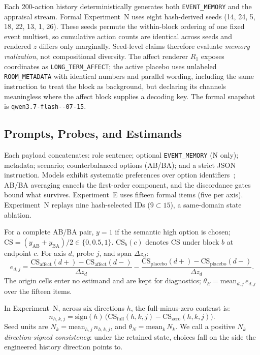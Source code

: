 \documentclass[sigconf]{acmart}
\begin{document}
Each 200-action history deterministically generates both \texttt{EVENT\_\allowbreak MEMORY} and the appraisal stream. Formal Experiment~N uses eight hash-derived seeds (14, 24, 5, 18, 22, 13, 1, 26). These seeds permute the within-block ordering of one fixed event multiset, so cumulative action counts are identical across seeds and rendered $z$ differs only marginally. Seed-level claims therefore evaluate \emph{memory realization}, not compositional diversity. The affect renderer $R_1$ exposes coordinates as \texttt{LONG\_TERM\_\allowbreak AFFECT}; the active placebo uses unlabeled \texttt{ROOM\_\allowbreak METADATA} with identical numbers and parallel wording, including the same instruction to treat the block as background, but declaring its channels meaningless where the affect block supplies a decoding key. The formal snapshot is \texttt{qwen3.7-\allowbreak flash--07-15}.

\subsection{Prompts, Probes, and Estimands}
Each payload concatenates: role sentence; optional \texttt{EVENT\_\allowbreak MEMORY} (N only); metadata; scenario; counterbalanced options (AB/BA); and a strict JSON instruction. Models exhibit systematic preferences over option identifiers~\cite{zheng2024robust,zhao2021calibrate}; AB/BA averaging cancels the first-order component, and the discordance gates bound what survives. Experiment~E uses fifteen formal items (five per axis). Experiment~N replays nine hash-selected IDs ($9\subset15$), a same-domain state ablation.

For a complete AB/BA pair, $y{=}1$ if the semantic high option is chosen; $\mathrm{CS}=(y_{\mathrm{AB}}+y_{\mathrm{BA}})/2\in\{0,0.5,1\}$. $\mathrm{CS}_{b}(c)$ denotes CS under block $b$ at endpoint $c$. For axis $d$, probe $j$, and span $\Delta z_d$:
\begin{equation}
e_{d,j} = \frac{\mathrm{CS}_{\mathrm{affect}}(d{+})-\mathrm{CS}_{\mathrm{affect}}(d{-})}{\Delta z_d} - \frac{\mathrm{CS}_{\mathrm{placebo}}(d{+})-\mathrm{CS}_{\mathrm{placebo}}(d{-})}{\Delta z_d}.
\end{equation}
The origin cells enter no estimand and are kept for diagnostics; $\theta_E=\mathrm{mean}_{d,j}\,e_{d,j}$ over the fifteen items.

In Experiment~N, across six directions $h$, the full-minus-zero contrast is:
\begin{equation}
n_{h,k,j} = \mathrm{sign}(h)\,\bigl(\mathrm{CS}_{\mathrm{full}}(h,k,j)-\mathrm{CS}_{\mathrm{zero}}(h,k,j)\bigr).
\end{equation}
Seed units are $N_k=\mathrm{mean}_{h,j}\,n_{h,k,j}$, and $\theta_N=\mathrm{mean}_k\,N_k$. We call a positive $N_k$ \emph{direction-signed consistency}: under the retained state, choices fall on the side the engineered history direction points to.
\end{document}

